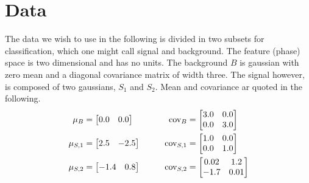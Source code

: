 
\section{Data}
The data we wish to use in the following is divided in two subsets for
classification, which one might call signal and background. The
feature (phase) space is two dimensional and has no units. The
background $B$ is gaussian with zero mean and a diagonal covariance
matrix of width three. The signal however, is composed of two
gaussians, $S_1$ and $S_2$. Mean and covariance ar quoted in the
following.
%
\begin{alignat}{3}
  \mu_{B}          &= \begin{bmatrix} 0.0 & 0.0 \end{bmatrix} &\qquad
  \text{cov}_{B}   &= \begin{bmatrix} 3.0 & 0.0 \\ 0.0 & 3.0 \end{bmatrix} \notag\\
  \mu_{S,1}        &= \begin{bmatrix} 2.5 & -2.5 \end{bmatrix} &\qquad
  \text{cov}_{S,1} &= \begin{bmatrix} 1.0 & 0.0 \\ 0.0 & 1.0 \end{bmatrix} \notag\\
  \mu_{S,2}        &= \begin{bmatrix} -1.4 & 0.8 \end{bmatrix} &\qquad
  \text{cov}_{S,2} &= \begin{bmatrix} 0.02 & 1.2 \\ -1.7 & 0.01 \end{bmatrix}
\end{alignat}
%


